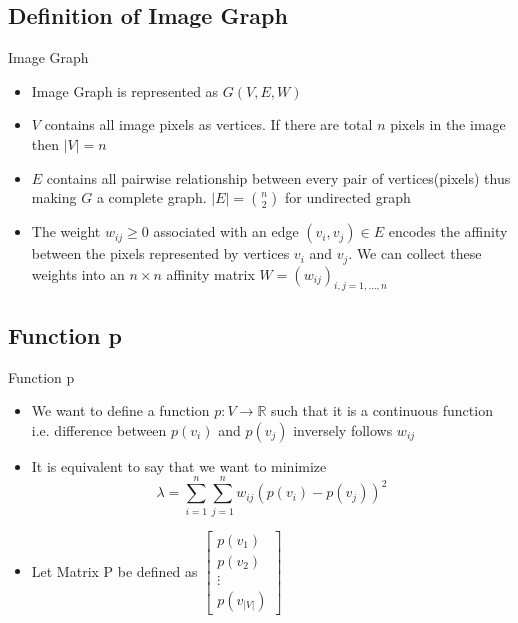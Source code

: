 \documentclass{beamer}
\begin{document}
\subsection{Definition of Image Graph}
\begin{frame}{Image Graph}

\begin{itemize}
	\item Image Graph is represented as $G(V, E, W)$
    \item $V$ contains all image pixels as vertices. If there are total $n$ pixels in the image then $|V| = n$
    \item $E$ contains all pairwise relationship between every pair of vertices(pixels) thus making $G$ a complete graph. $|E| = \binom{n}{2}$ for undirected graph
    \item The weight $w_{ij} ≥ 0$ associated with an edge $(v_i , v_j ) \in E$ encodes the affinity between the pixels represented by vertices $v_i$ and $v_j$. We can collect these weights into an $n \times n$ affinity matrix $W = (w_{ij})_{i,j=1,\ldots,n}$
    
\end{itemize}

\end{frame}


\subsection{Function p}
\begin{frame}{Function p}

\begin{itemize}

	\item We want to define a function $p : V \rightarrow \mathbb{R}$ such that it is a continuous function i.e. difference between $p(v_i)$ and $p(v_j)$ inversely follows $w_{ij}$
    \item It is equivalent to say that we want to minimize $$ \lambda = \sum_{i=1}^{n} \sum_{j=1}^{n} w_{ij}(p(v_i) - p(v_j))^2 $$
    \item Let Matrix P be defined as 
    	$\begin{bmatrix}
        	p(v_1)\\
            p(v_2)\\
            \vdots \\
            p(v_{|V|})
		\end{bmatrix}$
\end{itemize}

\end{frame}
\end{document}

